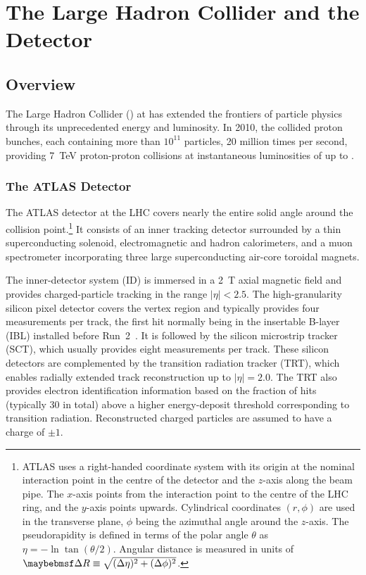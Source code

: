 \chapter{The Large Hadron Collider and the \ATLAS Detector}
\label{chap:detector}

\section{Overview}
The Large Hadron Collider (\LHC) at \CERN has extended the frontiers of particle physics through its unprecedented energy and luminosity.
In 2010, the \LHC collided proton bunches, each containing more than $10^{11}$ particles, 20 million times per second, providing \SI{7}{\TeV} proton-proton collisions at instantaneous luminosities of up to \peakLumi.


\subsection{The ATLAS Detector}\label{sec:atlas-detector}

\newcommand{\AtlasCoordFootnote}{%
ATLAS uses a right-handed coordinate system with its origin at the nominal interaction point in the centre of the detector and the \(z\)-axis along the beam pipe. The \(x\)-axis points from the interaction point to the centre of the LHC ring, and the \(y\)-axis points upwards. Cylindrical coordinates \((r,\phi)\) are used in the transverse plane, \(\phi\) being the azimuthal angle around the \(z\)-axis. The pseudorapidity is defined in terms of the polar angle \(\theta\) as \(\eta = -\ln \tan(\theta/2)\). Angular distance is measured in units of \(\DeltaR \equiv \sqrt{(\Delta\eta)^{2} + (\Delta\phi)^{2}}\).}

The ATLAS detector at the LHC covers nearly the entire solid angle around the collision point.\footnote{\AtlasCoordFootnote}
It consists of an inner tracking detector surrounded by a thin superconducting solenoid, electromagnetic and hadron calorimeters,
and a muon spectrometer incorporating three large superconducting air-core toroidal magnets.

The inner-detector system (ID) is immersed in a \SI{2}{\tesla} axial magnetic field 
and provides charged-particle tracking in the range \(|\eta| < 2.5\).
The high-granularity silicon pixel detector covers the vertex region and typically provides four measurements per track, 
the first hit normally being in the insertable B-layer (IBL) installed before Run~2~\cite{ATLAS-TDR-19,PIX-2018-001}.
It is followed by the silicon microstrip tracker (SCT), which usually provides eight measurements per track.
These silicon detectors are complemented by the transition radiation tracker (TRT),
which enables radially extended track reconstruction up to \(|\eta| = 2.0\). 
The TRT also provides electron identification information 
based on the fraction of hits (typically 30 in total) above a higher energy-deposit threshold corresponding to transition radiation.
Reconstructed charged particles are assumed to have a charge of $\pm 1$.

